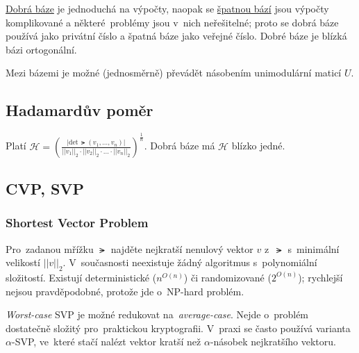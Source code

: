 \underline{Dobrá báze} je jednoduchá na výpočty, naopak se \underline{špatnou bází} jsou výpočty komplikované a některé~problémy jsou v~nich neřešitelné; proto se dobrá báze používá jako privátní číslo a špatná báze jako veřejné číslo.
Dobré báze je blízká bázi ortogonální.

Mezi bázemi je možné (jednosměrně) převádět násobením unimodulární\footnotemark{} maticí $U$.

\subsection{Hadamardův poměr}

Platí
$
\mathcal{H} =
\left( \frac{
| \text{det} \, \lat(v_1, \dots, v_n) | }{
|| v_1 ||_2 \cdot || v_2 ||_2 \cdot \dots \cdot ||v_n||_2
} \right)^{\frac{1}{n}}
$.
Dobrá báze má $\mathcal{H}$ blízko jedné.



\subsection{CVP, SVP}

\subsubsection{Shortest Vector Problem}

Pro~zadanou mřížku $\lat$ najděte nejkratší nenulový vektor $v$ z~$\lat$ s~minimální velikostí $||v||_2$.
V~současnosti neexistuje žádný algoritmus s~polynomiální složitostí.
Existují deterministické ($n^{O(n)}$) či randomizované ($2^{O(n)}$); rychlejší nejsou pravděpodobné, protože jde o~NP-hard problém.

\emph{Worst-case} SVP je možné redukovat na~\emph{average-case}.
Nejde o~problém dostatečně složitý pro~praktickou kryptografii.
V~praxi se často používá varianta $\alpha$-SVP, ve~které stačí nalézt vektor kratší než $\alpha$-násobek nejkratšího vektoru.


